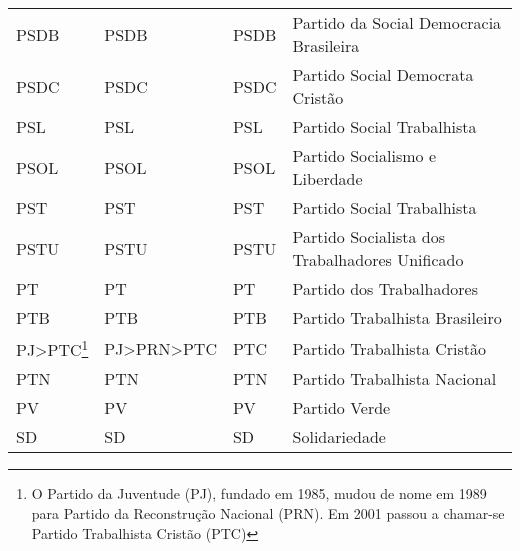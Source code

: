 \begin{table}
\begin{tabular}{l l l l}
  PSDB & PSDB & PSDB & Partido da Social Democracia Brasileira \\
  PSDC & PSDC & PSDC & Partido Social Democrata Cristão \\
  PSL & PSL & PSL & Partido Social Trabalhista \\
  PSOL & PSOL & PSOL & Partido Socialismo e Liberdade \\
  PST & PST & PST & Partido Social Trabalhista \\
  PSTU & PSTU & PSTU & Partido Socialista dos Trabalhadores Unificado \\
  PT & PT & PT & Partido dos Trabalhadores \\
  PTB & PTB & PTB & Partido Trabalhista Brasileiro \\
  PJ>PTC\footnote{O Partido da Juventude (PJ), fundado em 1985, mudou de nome
em 1989 para Partido da Reconstrução Nacional (PRN). Em 2001 passou a chamar-se
Partido Trabalhista Cristão (PTC)} & PJ>PRN>PTC & PTC & Partido Trabalhista Cristão \\
  PTN & PTN & PTN & Partido Trabalhista Nacional \\
  PV & PV & PV & Partido Verde \\
  SD & SD & SD & Solidariedade \\
\end{tabular}
\end{table}
